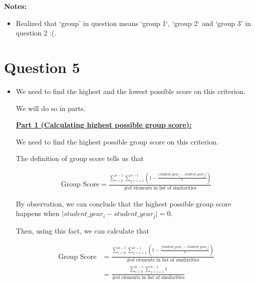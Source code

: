 \documentclass[12pt]{article}
\begin{document}
\bigskip

\textbf{Notes:}

\begin{itemize}
    \item Realized that `group' in question means `group 1`, `group 2` and `group 3' in question 2 :(.
\end{itemize}

\bigskip

\section*{Question 5}
\begin{itemize}
    \item

    \bigskip

    We need to find the highest and the lowest possible score on this criterion.

    \bigskip

    We will do so in parts.

    \bigskip

    \underline{\textbf{Part 1 (Calculating highest possible group score):}}

    \bigskip

    We need to find the highest possible group score on this criterion.

    \bigskip

    The definition of group score tells us that

    \setcounter{equation}{0}
    \begin{align}
        \text{Group Score} = \frac{\displaystyle\sum\limits_{i=0}^{n-1} \displaystyle\sum\limits_{j=i+1}^{n-1} \left(1 - \displaystyle\frac{\lvert student\_year_i - student\_year_j \rvert}{5} \right)}{\text{\# of elements in list of similarities}}
    \end{align}

    \bigskip

    By observation, we can conclude that the highest possible group score happens when
    $\lvert student\_year_i - student\_year_j \rvert = 0$.

    \bigskip

    Then, using this fact, we can calculate that

    \begin{align}
        \text{Group Score} &= \frac{\displaystyle\sum\limits_{i=0}^{n-1} \displaystyle\sum\limits_{j=i+1}^{n-1} \left(1 - \displaystyle\frac{\lvert student\_year_i - student\_year_j \rvert}{5} \right)}{\text{\# of elements in list of similarities}}\\
        &= \frac{\displaystyle\sum\limits_{i=0}^{n-1} \displaystyle\sum\limits_{j=i+1}^{n-1} 1}{\text{\# of elements in list of similarities}}
    \end{align}


\end{itemize}
\end{document}
